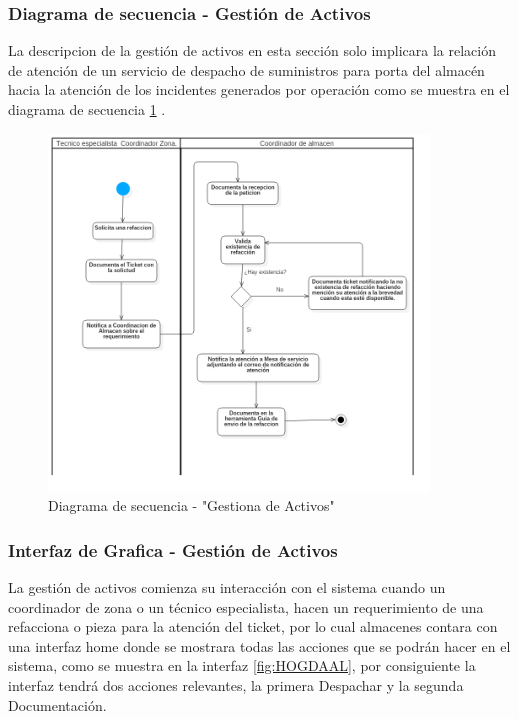 \subsubsection{Diagrama de secuencia - Gestión de Activos}

La descripcion de la gestión de activos en esta sección solo implicara la relación de atención de un servicio de despacho de suministros para porta del almacén hacia la atención de los incidentes generados por operación como se muestra en el diagrama de secuencia \ref{fig:GDADDF} .


\begin{figure}[H]
	\centering
	\includegraphics[width=0.9\textwidth]{Capitulo4/Img/GestionAc/GestionActivos}
	\caption{Diagrama de secuencia - "Gestiona de Activos"}
	\label{fig:GDADDF}
	\end{figure}
	

\subsubsection{Interfaz de Grafica - Gestión de Activos}
La gestión de activos comienza su interacción con el sistema cuando un coordinador de zona o un técnico especialista, hacen un requerimiento de una refacciona o pieza para la atención del ticket, por lo cual almacenes contara con una interfaz home donde se mostrara todas las acciones que se podrán hacer en el sistema, como se muestra en la interfaz  \ref{fig:HOGDAAL}, por consiguiente la interfaz tendrá  dos acciones relevantes, la primera Despachar y la segunda Documentación.

